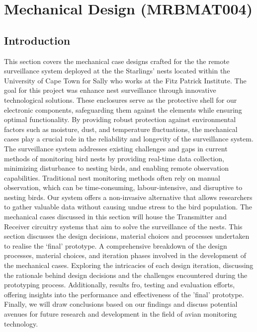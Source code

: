 \documentclass[class=report,11pt,crop=false]{standalone}
\begin{document}
\ifstandalone
\tableofcontents
\fi
\chapter{Mechanical Design (MRBMAT004)}


\section{Introduction}
This section covers the mechanical case designs crafted for the the remote surveillance system deployed at the the Starlings’ nests located within the University of Cape Town for Sally who works at the Fitz Patrick Institute. The goal for this project was enhance nest surveillance through innovative technological solutions.  These enclosures serve as the protective shell for our electronic components, safeguarding them against the elements while ensuring optimal functionality. By providing robust protection against environmental factors such as moisture, dust, and temperature fluctuations, the mechanical cases play a crucial role in the reliability and longevity of the surveillance system.
The surveillance system addresses existing challenges and gaps in current methods of monitoring bird nests by providing real-time data collection, minimizing disturbance to nesting birds, and enabling remote observation capabilities. Traditional nest monitoring methods often rely on manual observation, which can be time-consuming, labour-intensive, and disruptive to nesting birds. Our system offers a non-invasive alternative that allows researchers to gather valuable data without causing undue stress to the bird population.
The mechanical cases discussed in this section will house the Transmitter and Receiver circuitry systems that aim to solve the surveillance of the nests. This section discusses the design decisions, material choices and processes undertaken to realise the ‘final’ prototype. 
A comprehensive breakdown of the design processes, material choices, and iteration phases involved in the development of the mechanical cases. Exploring the intricacies of each design iteration, discussing the rationale behind design decisions and the challenges encountered during the prototyping process. Additionally,  results fro, testing and evaluation efforts, offering insights into the performance and effectiveness of the 'final' prototype. Finally, we will draw conclusions based on our findings and discuss potential avenues for future research and development in the field of avian monitoring technology.
\end{document}
